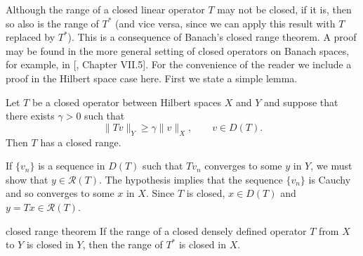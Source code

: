 {Although the range of a closed linear operator $T$ may not be closed, if it is, then so also is the range of $T^*$ (and vice versa, since we can apply this result with $T$ replaced by $T^*$). This is a consequence of Banach's closed range theorem. A proof may be found in the more general setting of closed operators on Banach spaces, for example, in [, Chapter VII.5]. For the convenience of the reader we include a proof in the Hilbert space case here. First we state a simple lemma.}

\begin{Lemma}\label{lem:operator-lower-bound-closed-range}
{Let $T$ be a closed operator between Hilbert spaces $X$ and $Y$ and suppose that there exists $\gamma>0$ such that}
\[
\|Tv\|_Y\geq\gamma\|v\|_X,\qquad v\in D(T).
\]
{Then $T$ has a closed range.}
\end{Lemma}

\begin{Proof}
{If $\{v_n\}$ is a sequence in $D(T)$ such that $Tv_n$ converges to some $y$ in $Y$, we must show that $y\in\mathcal R(T)$. The hypothesis implies that the sequence $\{v_n\}$ is Cauchy and so converges to some $x$ in $X$. Since $T$ is closed, $x\in D(T)$ and $y=Tx\in\mathcal R(T)$.}
\end{Proof}

\begin{Theorem}{{closed range theorem}}\label{thm:closed-range}
{If the range of a closed densely defined operator $T$ from $X$ to $Y$ is closed in $Y$, then the range of $T^*$ is closed in $X$.}
\end{Theorem}

